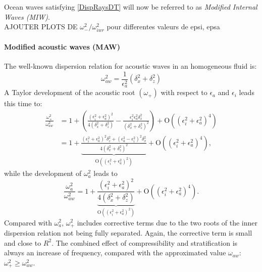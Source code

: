 \documentclass[a4paper,11pt]{article}
\begin{document}

Ocean waves satisfying \ref{DispRaysDT} will now be referred to as \textit{Modified Internal Waves (MIW)}.
\\

{\color{red}AJOUTER PLOTS DE $\omega_-^2/\omega_{iwr}^2$ pour differentes valeurs de epsi, epsa}

\paragraph{Modified acoustic waves (MAW)}
The well-known dispersion relation for acoustic waves in an homogeneous fluid is:
%
\begin{equation}
\omega_{aw}^2 =\frac{1}{\epsilon_a^2}\left(\delta_x^2+\delta_z^2\right)
\label{DispAcous}
\end{equation}
%
A Taylor development of the acoustic root $(\omega_+)$ with respect to $\epsilon_a$ and $\epsilon_i$ leads this time to:
%
\begin{align}
\frac{\omega_+^2}{\omega_{aw}^2}&=1
+
\left(
\frac{(\epsilon_i^2+\epsilon_a^2)^2}{4(\delta_x^2+\delta_z^2)}
-\frac{\epsilon_i^2\epsilon_a^2 \delta_x^2}{(\delta_x^2+\delta_z^2)^2}
\right)
+\mathrm{O}((\epsilon_i^{2}+\epsilon_a^{2})^4)
\label{DispAcousDT}\\
&=1+\underbrace{\frac{(\epsilon_i^2+\epsilon_a^2)^2\delta_z^2+(\epsilon_a^2-\epsilon_i^2)^2\delta_x^2}{4(\delta_x^2+\delta_z^2)^2}}_{\mathrm{O}((\epsilon_i^{2}+\epsilon_a^{2})^2)}
+\mathrm{O}((\epsilon_i^{2}+\epsilon_a^{2})^4), \label{DispAcousDTfact}
\end{align}
%
while the development of $\omega_a^2$ leads to
\[
\frac{\omega_a^2}{\omega_{aw}^2}=1+
\underbrace{\frac{(\epsilon_i^2+\epsilon_a^2)^2}{4(\delta_x^2+\delta_z^2)}}_{\mathrm{O}((\epsilon_i^{2}+\epsilon_a^{2})^2)}
+\mathrm{O}((\epsilon_i^{2}+\epsilon_a^{2})^4).
\]
Compared with $\omega_a^2$, $\omega_+^2$ includes corrective terms due to the two roots of the inner dispersion relation not being fully separated. Again, the corrective term is small and close to $R^2$. The combined effect of compressibility and stratification is always an increase of frequency, compared with the approximated value $\omega_{aw}$: $\omega_+^2\ge \omega_{aw}^2$.\\
\end{document}
